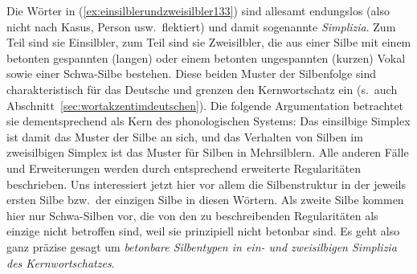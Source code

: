 \begin{exe}
  \ex\label{ex:einsilblerundzweisilbler133}
  \begin{xlist}
    \ex[*]{\label{ex:einsilblerundzweisilbler135} \textipa{[knI]}}
    \ex[*]{\label{ex:einsilblerundzweisilbler139} \textipa{[vi:Nk]}}
    \ex[*]{\label{ex:einsilblerundzweisilbler140} \textipa{[Pa:lt]}}
  \end{xlist}
\end{exe}

Die Wörter in (\ref{ex:einsilblerundzweisilbler133}) sind allesamt endungslos (also nicht nach Kasus, Person usw.\ flektiert) und damit sogenannte \textit{Simplizia}.
Zum Teil sind sie Einsilbler, zum Teil sind sie Zweisilbler, die aus einer Silbe mit einem betonten gespannten (langen) oder einem betonten ungespannten (kurzen) Vokal sowie einer Schwa-Silbe bestehen.
Diese beiden Muster der Silbenfolge sind charakteristisch für das Deutsche und grenzen den Kernwortschatz ein (s.\ auch Abschnitt~\ref{sec:wortakzentimdeutschen}).
Die folgende Argumentation betrachtet sie dementsprechend als Kern des phonologischen Systems:
Das einsilbige Simplex ist damit das Muster der Silbe an sich, und das Verhalten von Silben im zweisilbigen Simplex ist das Muster für Silben in Mehrsilblern.
Alle anderen Fälle und Erweiterungen werden durch entsprechend erweiterte Regularitäten beschrieben.
Uns interessiert jetzt hier vor allem die Silbenstruktur in der jeweils ersten Silbe bzw.\ der einzigen Silbe in diesen Wörtern.
Als zweite Silbe kommen hier nur Schwa-Silben vor, die von den zu beschreibenden Regularitäten als einzige nicht betroffen sind, weil sie prinzipiell nicht betonbar sind.
Es geht also ganz präzise gesagt um \textit{betonbare Silbentypen in ein- und zweisilbigen Simplizia des Kernwortschatzes}.

